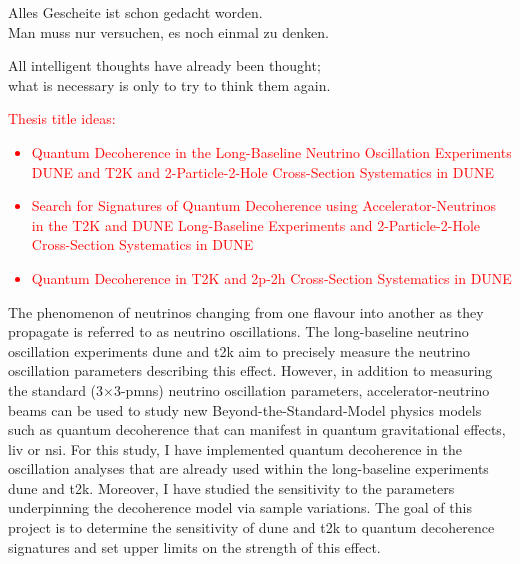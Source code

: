 \begin{savequote}[8cm]
Alles Gescheite ist schon gedacht worden.\\
Man muss nur versuchen, es noch einmal zu denken.

All intelligent thoughts have already been thought;\\
what is necessary is only to try to think them again.
\end{savequote}

\minitoc

\textcolor{red}{Thesis title ideas:
\begin{itemize}
    \item Quantum Decoherence in the Long-Baseline Neutrino Oscillation Experiments DUNE and T2K and 2-Particle-2-Hole Cross-Section Systematics in DUNE
    \item Search for Signatures of Quantum Decoherence using Accelerator-Neutrinos in the T2K and DUNE Long-Baseline Experiments and 2-Particle-2-Hole Cross-Section Systematics in DUNE
    \item Quantum Decoherence in T2K and 2p-2h Cross-Section Systematics in DUNE
\end{itemize}
}


The phenomenon of neutrinos changing from one flavour into another as they propagate is referred to as neutrino oscillations. The long-baseline neutrino oscillation experiments \acrshort{dune} and \acrshort{t2k} aim to precisely measure the neutrino oscillation parameters describing this effect. However, in addition to measuring the standard ($3$$\times$$3$-\acrshort{pmns}) neutrino oscillation parameters, accelerator-neutrino beams can be used to study new Beyond-the-Standard-Model physics models such as quantum decoherence that can manifest in quantum gravitational effects, \acrlong{liv} or \acrlong{nsi}. For this study, I have implemented quantum decoherence in the oscillation analyses that are already used within the long-baseline experiments \acrshort{dune} and \acrshort{t2k}. Moreover, I have studied the sensitivity to the parameters underpinning the decoherence model via sample variations. The goal of this project is to determine the sensitivity of \acrshort{dune} and \acrshort{t2k} to quantum decoherence signatures and set upper limits on the strength of this effect.